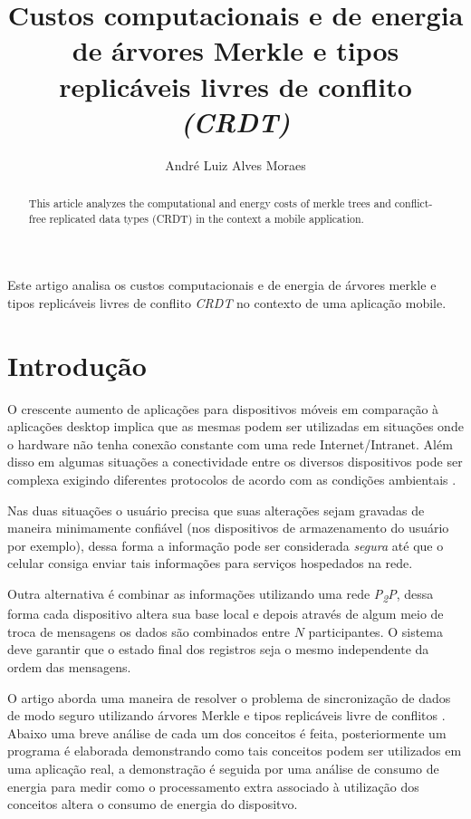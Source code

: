 \documentclass[12pt]{article}
\title{Custos computacionais e de energia de árvores Merkle e tipos replicáveis livres de conflito {\it (CRDT)}}
\author{André Luiz Alves Moraes\inst{1}}
\newcommand{\texsub}[1]{\textsubscript{#1}}
\begin{document}
\maketitle

\begin{abstract}
  This article analyzes the computational and energy costs of merkle trees and conflict-free replicated data types (CRDT) in the context a mobile application.
\end{abstract}
     
\begin{resumo}
  Este artigo analisa os custos computacionais e de energia de árvores merkle e tipos replicáveis livres de conflito {\it CRDT} no contexto de uma aplicação mobile.
\end{resumo}


\section{Introdução}

O crescente aumento de aplicações para dispositivos móveis em comparação à aplicações desktop \cite{riamobi} implica que as mesmas podem ser utilizadas em situações onde o hardware não tenha conexão constante com uma rede Internet/Intranet. Além disso em algumas situações a conectividade entre os diversos dispositivos pode ser complexa exigindo diferentes protocolos de acordo com as condições ambientais \cite{iotmines}.

Nas duas situações o usuário precisa que suas alterações sejam gravadas de maneira minimamente confiável (nos dispositivos de armazenamento do usuário por exemplo), dessa forma a informação pode ser considerada {\it segura} até que o celular consiga enviar tais informações para serviços hospedados na rede.

Outra alternativa é combinar as informações utilizando uma rede {\it P{\texsub 2}P}, dessa forma cada dispositivo altera sua base local e depois através de algum meio de troca de mensagens os dados são combinados entre \ensuremath{N} participantes. O sistema deve garantir que o estado final dos registros seja o mesmo independente da ordem das mensagens.

O artigo aborda uma maneira de resolver o problema de sincronização de dados de modo seguro utilizando árvores Merkle \cite{merkle:88} e tipos replicáveis livre de conflitos \cite{shapiro:11}. Abaixo uma breve análise de cada um dos conceitos é feita, posteriormente um programa é elaborada demonstrando como tais conceitos podem ser utilizados em uma aplicação real, a demonstração é seguida por uma análise de consumo de energia para medir como o processamento extra associado à utilização dos conceitos altera o consumo de energia do dispositvo.
\end{document}
